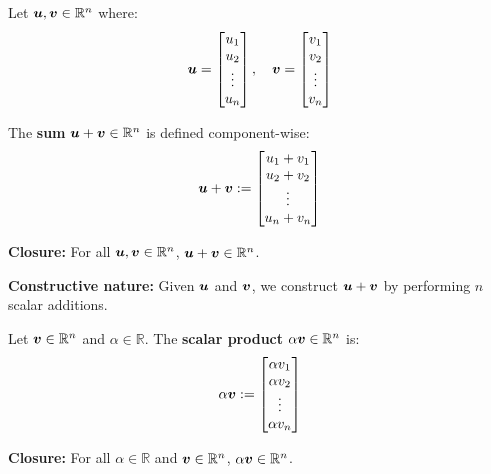 \begin{definition}\label{def:vector-addition}
    Let $\bm{u}, \bm{v} \in \mathbb{R}^n$ where:
    \[
        \bm{u} = \begin{bmatrix} u_1 \\ u_2 \\ \vdots \\ u_n \end{bmatrix}, \quad
        \bm{v} = \begin{bmatrix} v_1 \\ v_2 \\ \vdots \\ v_n \end{bmatrix}
    \]

    The \textbf{sum} $\bm{u} + \bm{v} \in \mathbb{R}^n$ is defined
    component-wise:
    \[
        \bm{u} + \bm{v} := \begin{bmatrix} u_1 + v_1 \\ u_2 + v_2 \\ \vdots \\ u_n + v_n \end{bmatrix}
    \]

    \textbf{Closure:} For all $\bm{u}, \bm{v} \in \mathbb{R}^n$, $\bm{u} + \bm{v} \in \mathbb{R}^n$.

    \textbf{Constructive nature:} Given $\bm{u}$ and $\bm{v}$, we construct $\bm{u} + \bm{v}$ by performing $n$ scalar additions.
\end{definition}

\begin{definition}\label{def:scalar-mult}
    Let $\bm{v} \in \mathbb{R}^n$ and $\alpha \in \mathbb{R}$. The \textbf{scalar product} $\alpha\bm{v} \in \mathbb{R}^n$ is:
    \[
        \alpha\bm{v} := \begin{bmatrix} \alpha v_1 \\ \alpha v_2 \\ \vdots \\ \alpha v_n \end{bmatrix}
    \]

    \textbf{Closure:} For all $\alpha \in \mathbb{R}$ and $\bm{v} \in \mathbb{R}^n$, $\alpha\bm{v} \in \mathbb{R}^n$.
\end{definition}

